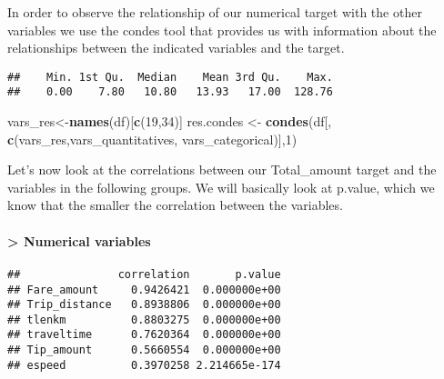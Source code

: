 \documentclass[
  18pt,
  a4paper]{article}
\newenvironment{Shaded}{\begin{snugshade}}{\end{snugshade}}
\newcommand{\CommentTok}[1]{\textcolor[rgb]{0.56,0.35,0.01}{\textit{#1}}}
\newcommand{\DecValTok}[1]{\textcolor[rgb]{0.00,0.00,0.81}{#1}}
\newcommand{\KeywordTok}[1]{\textcolor[rgb]{0.13,0.29,0.53}{\textbf{#1}}}
\newcommand{\NormalTok}[1]{#1}
\newcommand{\OperatorTok}[1]{\textcolor[rgb]{0.81,0.36,0.00}{\textbf{#1}}}
\newcommand{\StringTok}[1]{\textcolor[rgb]{0.31,0.60,0.02}{#1}}
\begin{document}
In order to observe the relationship of our numerical target with the
other variables we use the condes tool that provides us with information
about the relationships between the indicated variables and the target.

\begin{Shaded}
\end{Shaded}

\begin{verbatim}
##    Min. 1st Qu.  Median    Mean 3rd Qu.    Max. 
##    0.00    7.80   10.80   13.93   17.00  128.76
\end{verbatim}

\begin{Shaded}
\begin{Highlighting}[]
\NormalTok{vars_res<-}\KeywordTok{names}\NormalTok{(df)[}\KeywordTok{c}\NormalTok{(}\DecValTok{19}\NormalTok{,}\DecValTok{34}\NormalTok{)]}
\NormalTok{res.condes <-}\StringTok{ }\KeywordTok{condes}\NormalTok{(df[, }\KeywordTok{c}\NormalTok{(vars_res,vars_quantitatives, vars_categorical)],}\DecValTok{1}\NormalTok{)}
\end{Highlighting}
\end{Shaded}

Let's now look at the correlations between our Total\_amount target and
the variables in the following groups. We will basically look at
p.value, which we know that the smaller the correlation between the
variables.

\hypertarget{numerical-variables}{%
\paragraph{\textgreater{} Numerical
variables}\label{numerical-variables}}

\begin{Shaded}
\end{Shaded}

\begin{verbatim}
##               correlation       p.value
## Fare_amount     0.9426421  0.000000e+00
## Trip_distance   0.8938806  0.000000e+00
## tlenkm          0.8803275  0.000000e+00
## traveltime      0.7620364  0.000000e+00
## Tip_amount      0.5660554  0.000000e+00
## espeed          0.3970258 2.214665e-174
\end{verbatim}
\end{document}
